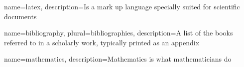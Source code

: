 

\makeglossaries %


{
        name=latex,
        description={Is a mark up language specially suited for
scientific documents}
}

{
        name=bibliography,
        plural=bibliographies,
        description={A list of the books referred to in a scholarly work,
typically printed as an appendix}
}

{
    name=mathematics,
    description={Mathematics is what mathematicians do}
}



